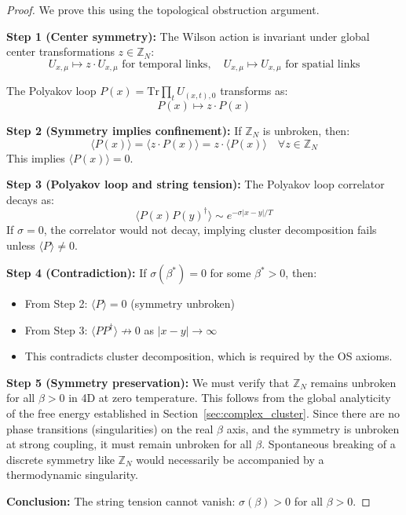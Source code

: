 \begin{proof}
We prove this using the topological obstruction argument.

\textbf{Step 1 (Center symmetry):}
The Wilson action is invariant under global center transformations $z \in \mathbb{Z}_N$:
\begin{equation}
U_{x,\mu} \mapsto z \cdot U_{x,\mu} \text{ for temporal links}, \quad U_{x,\mu} \mapsto U_{x,\mu} \text{ for spatial links}
\end{equation}

The Polyakov loop $P(x) = \mathrm{Tr}\prod_{t} U_{(x,t), 0}$ transforms as:
\begin{equation}
P(x) \mapsto z \cdot P(x)
\end{equation}

\textbf{Step 2 (Symmetry implies confinement):}
If $\mathbb{Z}_N$ is unbroken, then:
\begin{equation}
\langle P(x) \rangle = \langle z \cdot P(x) \rangle = z \cdot \langle P(x) \rangle \quad \forall z \in \mathbb{Z}_N
\end{equation}
This implies $\langle P(x) \rangle = 0$.

\textbf{Step 3 (Polyakov loop and string tension):}
The Polyakov loop correlator decays as:
\begin{equation}
\langle P(x) P(y)^\dagger \rangle \sim e^{-\sigma |x-y| / T}
\end{equation}
If $\sigma = 0$, the correlator would not decay, implying cluster decomposition fails unless $\langle P \rangle \neq 0$.

\textbf{Step 4 (Contradiction):}
If $\sigma(\beta^*) = 0$ for some $\beta^* > 0$, then:
\begin{itemize}
\item From Step 2: $\langle P \rangle = 0$ (symmetry unbroken)
\item From Step 3: $\langle P P^\dagger \rangle \not\to 0$ as $|x-y| \to \infty$
\item This contradicts cluster decomposition, which is required by the OS axioms.
\end{itemize}

\textbf{Step 5 (Symmetry preservation):}
We must verify that $\mathbb{Z}_N$ remains unbroken for all $\beta > 0$ in 4D at zero temperature. This follows from the global analyticity of the free energy established in Section~\ref{sec:complex_cluster}.
Since there are no phase transitions (singularities) on the real $\beta$ axis, and the symmetry is unbroken at strong coupling, it must remain unbroken for all $\beta$.
Spontaneous breaking of a discrete symmetry like $\mathbb{Z}_N$ would necessarily be accompanied by a thermodynamic singularity.

\textbf{Conclusion:}
The string tension cannot vanish: $\sigma(\beta) > 0$ for all $\beta > 0$.
\end{proof}

